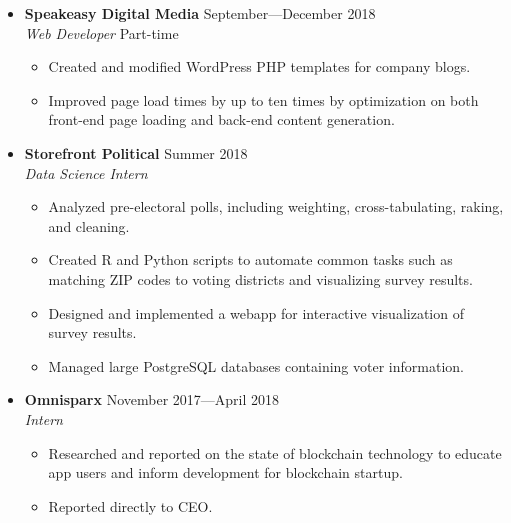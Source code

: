 \documentclass[12pt,letterpaper]{article}
\newenvironment{explist}
{\begin{itemize}[label=\textbf{--},itemsep=1pt,topsep=0pt,partopsep=0pt,parsep=0pt]}
{\end{itemize}}
\begin{document}
\begin{itemize}[label=]
    \item
        \textbf{Speakeasy Digital Media} \hfill September---December 2018\\
        \textit{Web Developer} \hfill Part-time
        \begin{explist}
        \item Created and modified WordPress PHP templates for company blogs.
        \item Improved page load times by up to ten times by optimization on both front-end page loading and back-end content generation.
        \end{explist}

    \item
        \textbf{Storefront Political} \hfill Summer 2018\\
        \textit{Data Science Intern}
        \begin{explist}
        \item Analyzed pre-electoral polls, including weighting, cross-tabulating, raking, and cleaning.
        \item Created R and Python scripts to automate common tasks such as matching ZIP codes to voting districts and visualizing survey results.
        \item Designed and implemented a webapp for interactive visualization of survey results.
        \item Managed large PostgreSQL databases containing voter information.
        \end{explist}

    \item
        \textbf{Omnisparx} \hfill November 2017---April 2018\\
        \textit{Intern}
        \begin{explist}
        \item Researched and reported on the state of blockchain technology to educate app users and inform development for blockchain startup.
        \item Reported directly to CEO.
        \end{explist}

\end{itemize}
\end{document}
